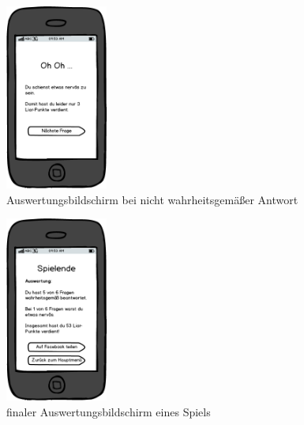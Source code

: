 \documentclass[10pt, a4paper, oneside, titlepage]{scrartcl} %
\begin{document}
	\begin{figure}[ht!]
		\begin{center}
			\includegraphics[width=0.3\textwidth]{mockup_05_score2.png}
		\end{center}
		\caption[Mockup Bildschirm Fragenauswertung Lüge]{Auswertungsbildschirm bei nicht wahrheitsgemäßer Antwort}
		\label{fig:mockup_05}
	\end{figure}	

	\begin{figure}[ht!]
		\begin{center}
			\includegraphics[width=0.3\textwidth]{mockup_06_finalscore.png}
		\end{center}
		\caption[Mockup finaler Bildschirm zur Fragenauswertung]{finaler Auswertungsbildschirm eines Spiels}
		\label{fig:mockup_06}
	\end{figure}	
\end{document}
